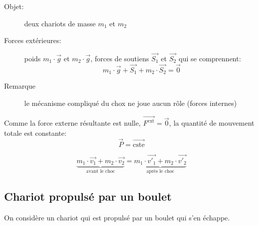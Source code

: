 \documentclass[
    11pt,
    a4paper,
    oneside,
    headinlcude, footinclude,
    twoside,
]{report}
\renewcommand{\vec}[1]{\overrightarrow{#1}}
\begin{document}
\begin{center}
\begin{minipage}{.5\linewidth}
{
        }
    \end{minipage}
    \begin{minipage}{.49\linewidth}
        \setlength{\parskip}{.3em}

        \begin{description}
            \item[Objet:] deux chariots de masse $m_{1}$ et $m_{2}$
            \item[Forces extérieures:] poids $m_{1} \cdot \vec g$ et $m_{2} \cdot \vec g$,
                forces de soutiens $\vec{S_{1}}$ et $\vec{S_{2}}$ qui se
                comprennent: $$m_{1} \cdot \vec g + \vec{S_{1}} + m_{2} \cdot
                \vec{S_{2}} = \vec 0$$
            \item[Remarque] le mécanisme compliqué du chox ne joue aucun rôle
                (forces internes)
        \end{description}
    \end{minipage}
\end{center}

Comme la force externe résultante est nulle, $\vec{F^{\text{ext}}} = \vec 0$,
la quantité de mouvement totale est constante: $$\vec P = \vec{\text{cste}}$$

\begin{equation}
    \underbrace{m_{1} \cdot \vec{v_{1}} + m_{2} \cdot \vec{v_{2}}}_{\text{avant
    le choc}} = \underbrace{m_{1} \cdot \vec{v'_{1}} + m_{2} \cdot \vec{v'_{2}}}_{\text{après
    le choc}}
\end{equation}

\subsection{Chariot propulsé par un boulet}
\label{sub:chariot_propulse_par_un_boulet}

On considère un chariot qui est propulsé par un boulet qui s'en échappe.
\end{document}
